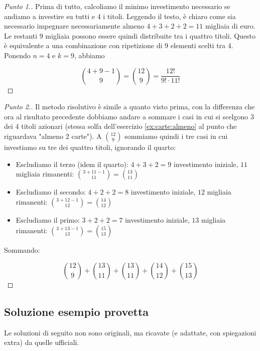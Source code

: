 \documentclass[12pt]{article}
\renewcommand\qedsymbol{$\square$}
\begin{document}
\begin{proof}[Punto 1.]
	Prima di tutto, calcoliamo il minimo investimento necessario se andiamo a investire su tutti e 4 i titoli. Leggendo il testo, è chiaro come sia necessario impegnare necessariamente almeno $4 + 3 + 2 + 2 = 11$ migliaia di euro. Le restanti 9 migliaia possono essere quindi distribuite tra i quattro titoli. Questo è equivalente a una combinazione con ripetizione di 9 elementi scelti tra 4. Ponendo $n = 4$ e $k = 9$, abbiamo
	
	\[
		\binom{4 + 9 - 1}{9} = \binom{12}{9} = \frac{12!}{9! \cdot 11!}
    \]
\end{proof}

\renewcommand\qedsymbol{$\blacksquare$}

\begin{proof}[Punto 2.]
	Il metodo risolutivo è simile a quanto visto prima, con la differenza che ora al risultato precedente dobbiamo andare a sommare i casi in cui si scelgono 3 dei 4 titoli azionari (stessa solfa dell'esercizio \ref{ex:carte:almeno} al punto che riguardava "almeno 2 carte"). A $\binom{12}{9}$ sommiamo quindi i tre casi in cui investiamo su tre dei quattro titoli, ignorando il quarto:
	\begin{itemize}
		\item Escludiamo il terzo (idem il quarto): $4+3+2=9$ investimento iniziale, $11$ migliaia rimanenti: $\binom{3 + 11 - 1}{11} = \binom{13}{11}$
		\item Escludiamo il secondo: $4+2+2=8$ investimento iniziale, $12$ migliaia rimanenti: $\binom{3 + 12 - 1}{12} = \binom{14}{12}$
		\item Escludiamo il primo: $3+2+2=7$ investimento iniziale, $13$ migliaia rimanenti: $\binom{3 + 13 - 1}{13} = \binom{15}{13}$
	\end{itemize}
	
	Sommando:
	
	\[
		\binom{12}{9} + \binom{13}{11} + \binom{13}{11} + \binom{14}{12} + \binom{15}{13}
    \]
	
\end{proof}

\subsection{Soluzione esempio provetta}

Le soluzioni di seguito non sono originali, ma ricavate (e adattate, con spiegazioni extra) da quelle ufficiali.

\renewcommand\qedsymbol{$\square$}
\end{document}
